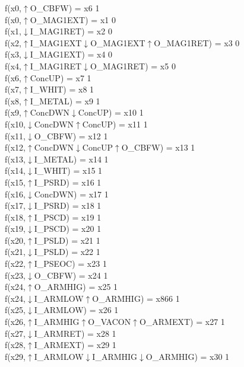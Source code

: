 f(x0,$\uparrow$O\_CBFW) = x6 {1} \\
f(x0,$\uparrow$O\_MAG1EXT) = x1 {0} \\
f(x1,$\downarrow$I\_MAG1RET) = x2 {0} \\
f(x2,$\uparrow$I\_MAG1EXT$\downarrow$O\_MAG1EXT$\uparrow$O\_MAG1RET) = x3 {0} \\
f(x3,$\downarrow$I\_MAG1EXT) = x4 {0} \\
f(x4,$\uparrow$I\_MAG1RET$\downarrow$O\_MAG1RET) = x5 {0} \\
f(x6,$\uparrow$ConcUP) = x7 {1} \\
f(x7,$\uparrow$I\_WHIT) = x8 {1} \\
f(x8,$\uparrow$I\_METAL) = x9 {1} \\
f(x9,$\uparrow$ConcDWN$\downarrow$ConcUP) = x10 {1} \\
f(x10,$\downarrow$ConcDWN$\uparrow$ConcUP) = x11 {1} \\
f(x11,$\downarrow$O\_CBFW) = x12 {1} \\
f(x12,$\uparrow$ConcDWN$\downarrow$ConcUP$\uparrow$O\_CBFW) = x13 {1} \\
f(x13,$\downarrow$I\_METAL) = x14 {1} \\
f(x14,$\downarrow$I\_WHIT) = x15 {1} \\
f(x15,$\uparrow$I\_PSRD) = x16 {1} \\
f(x16,$\downarrow$ConcDWN) = x17 {1} \\
f(x17,$\downarrow$I\_PSRD) = x18 {1} \\
f(x18,$\uparrow$I\_PSCD) = x19 {1} \\
f(x19,$\downarrow$I\_PSCD) = x20 {1} \\
f(x20,$\uparrow$I\_PSLD) = x21 {1} \\
f(x21,$\downarrow$I\_PSLD) = x22 {1} \\
f(x22,$\uparrow$I\_PSEOC) = x23 {1} \\
f(x23,$\downarrow$O\_CBFW) = x24 {1} \\
f(x24,$\uparrow$O\_ARMHIG) = x25 {1} \\
f(x24,$\downarrow$I\_ARMLOW$\uparrow$O\_ARMHIG) = x866 {1} \\
f(x25,$\downarrow$I\_ARMLOW) = x26 {1} \\
f(x26,$\uparrow$I\_ARMHIG$\uparrow$O\_VACON$\uparrow$O\_ARMEXT) = x27 {1} \\
f(x27,$\downarrow$I\_ARMRET) = x28 {1} \\
f(x28,$\uparrow$I\_ARMEXT) = x29 {1} \\
f(x29,$\uparrow$I\_ARMLOW$\downarrow$I\_ARMHIG$\downarrow$O\_ARMHIG) = x30 {1} \\
